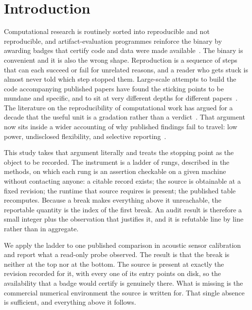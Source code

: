 \section{Introduction}

Computational research is routinely sorted into reproducible and not
reproducible, and artifact-evaluation programmes reinforce the binary by awarding
badges that certify code and data were made available~\cite{acmbadging2020}. The
binary is convenient and it is also the wrong shape. Reproduction is a sequence
of steps that can each succeed or fail for unrelated reasons, and a reader who
gets stuck is almost never told which step stopped them. Large-scale attempts to
build the code accompanying published papers have found the sticking points to be
mundane and specific, and to sit at very different depths for different
papers~\cite{collberg2016repeatability}. The literature on the reproducibility of
computational work has argued for a decade that the useful unit is a gradation
rather than a verdict~\cite{peng2011reproducible,baker2016reproducibility,
donoho2010invitation,ince2012open,stodden2016science,goodman2016mean,
plesser2018repro}. That argument now sits inside a wider accounting of why
published findings fail to travel: low power, undisclosed flexibility, and
selective reporting~\cite{ioannidis2005why,ioannidis2014true,button2013power,
simmons2011false,head2015phacking,openscience2015repro,begley2012raise,
nature2016reality,munafo2017manifesto}.

This study takes that argument literally and treats the stopping point as the
object to be recorded. The instrument is a ladder of \NRungs{} rungs, described
in the methods, on which each rung is an assertion checkable on a given machine
without contacting anyone: a citable record exists; the source is obtainable at a
fixed revision; the runtime that source requires is present; the published table
recomputes. Because a break makes everything above it unreachable, the reportable
quantity is the index of the first break. An audit result is therefore a small
integer plus the observation that justifies it, and it is refutable line by line
rather than in aggregate.

We apply the ladder to one published comparison in acoustic sensor calibration
and report what a read-only probe observed. The result is that the break is
neither at the top nor at the bottom. The source is present at exactly the
revision recorded for it, with every one of its \EntryPoints{} entry points on
disk, so the availability that a badge would certify is genuinely there. What is
missing is the commercial numerical environment the source is written for. That
single absence is sufficient, and everything above it follows.

